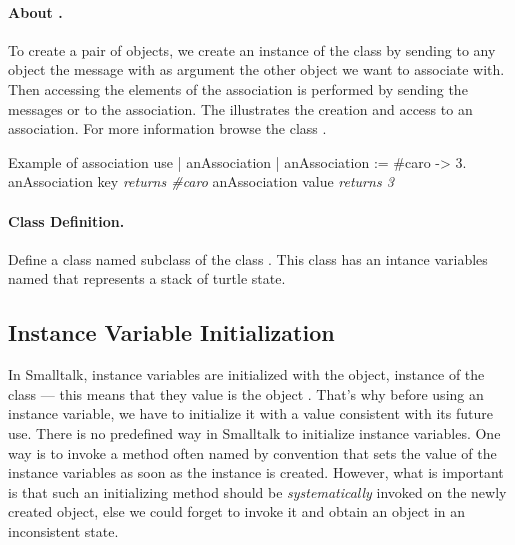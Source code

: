 \paragraph{About .} To create a pair
of objects, we create an instance of the class  by
sending to any object the message \ct{->} 
with as argument the other object we want to associate with. Then
accessing the elements of the association is performed by sending the
messages  or  to the association. The
 illustrates the creation and access to an
association. For more information browse the class .

\begin{scriptwithtitle}{Example of association use}\label{scr:association}
| anAssociation |
anAssociation := \#caro -> 3.
anAssociation key \emph{returns \#caro}
anAssociation value \emph{returns 3}
\end{scriptwithtitle}


\paragraph{Class Definition.}
Define a class named  subclass of the class
. This class has an intance variables named 
that represents a stack of turtle state.


\subsection{Instance Variable Initialization} \label{sec:variableinitialization}
In Smalltalk, instance 
variables are initialized with the  object, instance of the
class  --- this means that they value is the
object . That's why before using an instance variable, we have
to initialize it with a value consistent with its future use. There is
no predefined way in Smalltalk to initialize instance variables.  One
way is to invoke a method often named by convention
 that sets the value of the instance variables as soon
as the instance is created.  However, what is important is that such
an initializing method should be \emph{systematically} invoked on the
newly created object, else we could forget to invoke it and obtain an
object in an inconsistent state.

